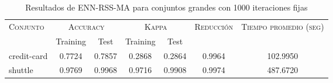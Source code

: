 \begin{table}[]
\centering
\begin{tabular}{l c c c c c c}
\hline
\multirow{2}{*}{\textsc{Conjunto}}
	& \multicolumn{2}{c}{\textsc{Accuracy}}
	& \multicolumn{2}{c}{\textsc{Kappa}}
	& \textsc{Reducción}
	& \textsc{Tiempo promedio (seg)} \\
	& Training & Test
	& Training & Test \\ 
\hline
\hline

credit-card & 0.7724 & 0.7857 & 0.2868 & 0.2864 & 0.9964 & 102.9950 \\
shuttle & 0.9769 & 0.9968 & 0.9716 & 0.9908 & 0.9974 & 487.6720 \\

\hline
\end{tabular}
\caption{Resultados de ENN-RSS-MA para conjuntos grandes con 1000 iteraciones fijas}
\label{res-grande-ENN-RSS-MA}
\end{table}

\clearpage

